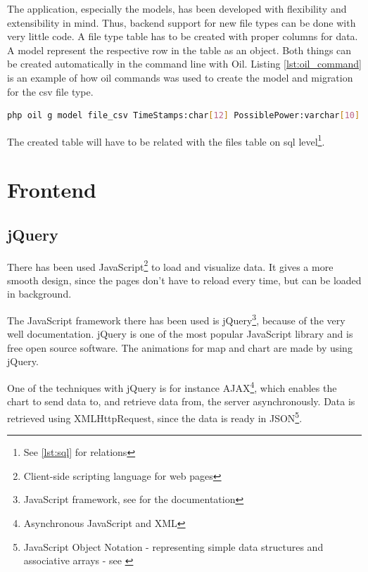 The application, especially the models, has been developed with flexibility and extensibility in mind. Thus, backend support for new file types can be done with very little code. A file type table has to be created with proper columns for data. A \textsf{model} represent the respective row in the table as an object. Both things can be created automatically in the command line with Oil. Listing \ref{lst:oil_command} is an example of how oil commands was used to create the model and migration for the csv file type.
\begin{lstlisting}[language=sh,caption={Oil command for creating model and migration},label={lst:oil_command}]
php oil g model file_csv TimeStamps:char[12] PossiblePower:varchar[10] WindSpeed:varchar[10] RegimePossible:varchar[10] OutputPower:varchar[10] RegimeOutput:varchar[10] TimeStampsR:char[19] file_id:bigint
\end{lstlisting}

The created table will have to be related with the \textsf{files} table on sql level\footnote{See \ref{lst:sql} for relations}.

\section{Frontend}
\subsection{jQuery}
There has been used JavaScript\footnote{Client-side scripting language for web pages} to load and visualize data. It gives a more smooth design, since the pages don't have to reload every time, but can be loaded in background.

The JavaScript framework there has been used is jQuery\footnote{JavaScript framework, see \cite{jquery} for the documentation}, because of the very well documentation. jQuery is one of the most popular JavaScript library and is free open source software. The animations for map and chart are made by using jQuery.
 
One of the techniques with jQuery is for instance AJAX\footnote{Asynchronous JavaScript and XML}, which enables the chart to send data to, and retrieve data from, the server asynchronously. Data is retrieved using XMLHttpRequest, since the data is ready in JSON\footnote{JavaScript Object Notation - representing simple data structures and associative arrays - see \cite{json}}.

